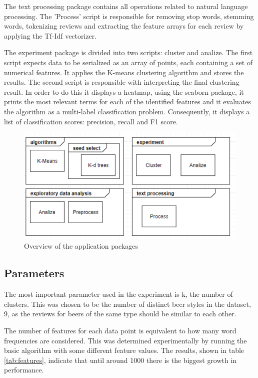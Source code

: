 \documentclass[12pt]{article}
\begin{document}
	The text processing package contains all operations related to natural language processing. The 'Process' script is responsible for removing stop words, stemming words, tokenizing reviews and extracting the feature arrays for each review by applying the Tf-Idf vectorizer.
	
	The experiment package is divided into two scripts: cluster and analize. The first script expects data to be serialized as an array of points, each containing a set of numerical features. It applies the K-means clustering algorithm and stores the results. The second script is responsible with interpreting the final clustering result. In order to do this it displays a heatmap, using the seaborn package, it prints the most relevant terms for each of the identified features and it evaluates the algorithm as a multi-label classification problem. Consequently, it displays a list of classification scores: precision, recall and F1 score.
	
	\begin{figure}
		\includegraphics[width=\linewidth]{resources/design.png}
		\caption{Overview of the application packages}
		\label{fig:design}
	\end{figure}
		
	\subsection{Parameters}
	The most important parameter used in the experiment is k, the number of clusters. This was chosen to be the number of distinct beer styles in the dataset, 9, as the reviews for beers of the same type should be similar to each other.
	
	The number of features for each data point is equivalent to how many word frequencies are considered. This was determined experimentally by running the basic algorithm with some different feature values. The results, shown in table \ref{tab:features}, indicate that until around 1000 there is the biggest growth in performance.
	
\end{document}
